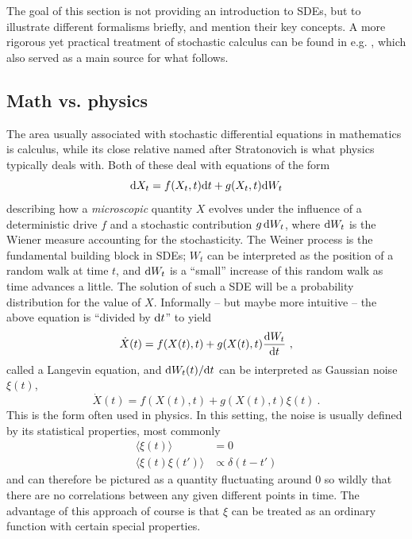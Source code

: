 The goal of this section is not providing an introduction to SDEs, but to illustrate different formalisms briefly, and mention their key concepts. A more rigorous yet practical treatment of stochastic calculus can be found in e.g. \cite{sde}, which also served as a main source for what follows.


\subsection{Math vs. physics}
\label{sec:math vs physics}

The area usually associated with stochastic differential equations in mathematics is \Ito{} calculus, while its close relative named after Stratonovich is what physics typically deals with. Both of these deal with equations of the form
%
\begin{equation}
	\label{eqn:sde}
	\mathrm{d} X_t = f(X_t,t) \mathrm{d} t + g(X_t,t) \mathrm{d} W_t
\end{equation}
%
describing how a \emph{microscopic} quantity \(X\) evolves under the influence of a deterministic drive \(f\) and a stochastic contribution \(g\,\mathrm{d} W_t\), where \(\mathrm{d} W_t\) is the Wiener measure accounting for the stochasticity. The Weiner process is the fundamental building block in SDEs; \(W_t\) can be interpreted as the position of a random walk at time \(t\), and \(\mathrm{d} W_t\) is a ``small'' increase of this random walk as time advances a little. The solution of such a SDE will be a probability distribution for the value of \(X\).
Informally -- but maybe more intuitive -- the above equation is ``divided by \(\mathrm{d} t\)'' to yield
%
\begin{equation}
	\dot X(t) = f(X(t),t) + g(X(t),t)\frac{\mathrm{d} W_t}{\mathrm{d} t} ~,
\end{equation}
%
called a Langevin equation, and \(\mathrm{d} W_t(t)/\mathrm{d} t\) can be interpreted as Gaussian noise \(\xi(t)\),
\begin{equation}
	\dot X(t) = f(X(t),t) + g(X(t),t)\xi(t)~.
\end{equation}
%
This is the form often used in physics. In this setting, the noise is usually defined by its statistical properties, most commonly
\begin{align}
	\langle\xi(t)\rangle &= 0 \\
	\langle\xi(t)\xi(t')\rangle &\propto \delta(t-t')
\end{align}
%
and can therefore be pictured as a quantity fluctuating around \(0\) so wildly that there are no correlations between any given different points in time. The advantage of this approach of course is that \(\xi\) can be treated as an ordinary function with certain special properties.


